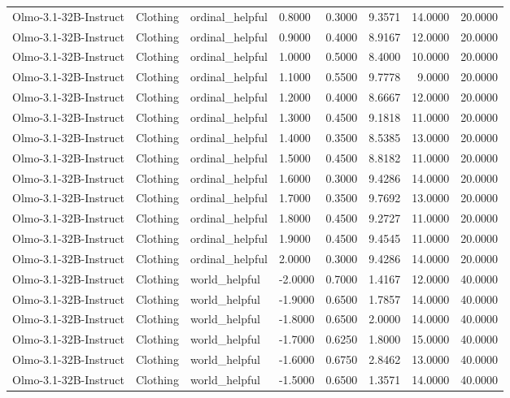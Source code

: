 \begin{table}
\begin{tabular}{llllrrrr}
Olmo-3.1-32B-Instruct & Clothing & ordinal_helpful & 0.8000 & 0.3000 & 9.3571 & 14.0000 & 20.0000 \\
Olmo-3.1-32B-Instruct & Clothing & ordinal_helpful & 0.9000 & 0.4000 & 8.9167 & 12.0000 & 20.0000 \\
Olmo-3.1-32B-Instruct & Clothing & ordinal_helpful & 1.0000 & 0.5000 & 8.4000 & 10.0000 & 20.0000 \\
Olmo-3.1-32B-Instruct & Clothing & ordinal_helpful & 1.1000 & 0.5500 & 9.7778 & 9.0000 & 20.0000 \\
Olmo-3.1-32B-Instruct & Clothing & ordinal_helpful & 1.2000 & 0.4000 & 8.6667 & 12.0000 & 20.0000 \\
Olmo-3.1-32B-Instruct & Clothing & ordinal_helpful & 1.3000 & 0.4500 & 9.1818 & 11.0000 & 20.0000 \\
Olmo-3.1-32B-Instruct & Clothing & ordinal_helpful & 1.4000 & 0.3500 & 8.5385 & 13.0000 & 20.0000 \\
Olmo-3.1-32B-Instruct & Clothing & ordinal_helpful & 1.5000 & 0.4500 & 8.8182 & 11.0000 & 20.0000 \\
Olmo-3.1-32B-Instruct & Clothing & ordinal_helpful & 1.6000 & 0.3000 & 9.4286 & 14.0000 & 20.0000 \\
Olmo-3.1-32B-Instruct & Clothing & ordinal_helpful & 1.7000 & 0.3500 & 9.7692 & 13.0000 & 20.0000 \\
Olmo-3.1-32B-Instruct & Clothing & ordinal_helpful & 1.8000 & 0.4500 & 9.2727 & 11.0000 & 20.0000 \\
Olmo-3.1-32B-Instruct & Clothing & ordinal_helpful & 1.9000 & 0.4500 & 9.4545 & 11.0000 & 20.0000 \\
Olmo-3.1-32B-Instruct & Clothing & ordinal_helpful & 2.0000 & 0.3000 & 9.4286 & 14.0000 & 20.0000 \\
Olmo-3.1-32B-Instruct & Clothing & world_helpful & -2.0000 & 0.7000 & 1.4167 & 12.0000 & 40.0000 \\
Olmo-3.1-32B-Instruct & Clothing & world_helpful & -1.9000 & 0.6500 & 1.7857 & 14.0000 & 40.0000 \\
Olmo-3.1-32B-Instruct & Clothing & world_helpful & -1.8000 & 0.6500 & 2.0000 & 14.0000 & 40.0000 \\
Olmo-3.1-32B-Instruct & Clothing & world_helpful & -1.7000 & 0.6250 & 1.8000 & 15.0000 & 40.0000 \\
Olmo-3.1-32B-Instruct & Clothing & world_helpful & -1.6000 & 0.6750 & 2.8462 & 13.0000 & 40.0000 \\
Olmo-3.1-32B-Instruct & Clothing & world_helpful & -1.5000 & 0.6500 & 1.3571 & 14.0000 & 40.0000 \\

\end{tabular}
\end{table}

